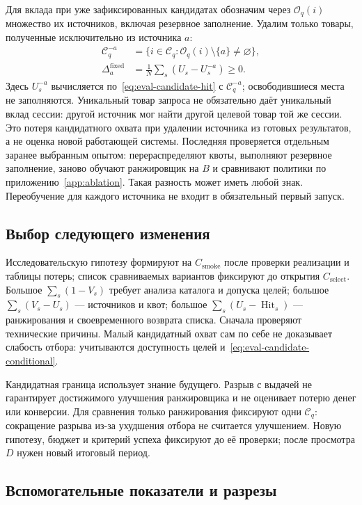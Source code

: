 \documentclass[12pt,a4paper]{article}
\theoremstyle{plainru}
\begin{document}
Для вклада при уже зафиксированных кандидатах обозначим через
$\mathcal O_q(i)$ множество их источников, включая резервное заполнение.
Удалим только товары, полученные исключительно из источника $a$:
\begin{align}\label{eq:eval-source-removal}
\mathcal C_q^{-a}
&=\{i\in\mathcal C_q:\mathcal O_q(i)\setminus\{a\}\ne\varnothing\},\\
\Delta_a^{\mathrm{fixed}}
&=\frac1N\sum_s(U_s-U_s^{-a})\ge0.
\nonumber
\end{align}
Здесь $U_s^{-a}$ вычисляется по~\eqref{eq:eval-candidate-hit}
с $\mathcal C_q^{-a}$; освободившиеся места не заполняются.
Уникальный товар запроса не обязательно даёт уникальный вклад сессии:
другой источник мог найти другой целевой товар той же сессии.
Это потеря кандидатного охвата при удалении источника из готовых
результатов, а не оценка новой работающей системы.
Последняя проверяется отдельным заранее выбранным опытом:
перераспределяют квоты, выполняют резервное заполнение, заново обучают
ранжировщик на $B$ и сравнивают политики по приложению~\ref{app:ablation}.
Такая разность может иметь любой знак. Переобучение для каждого
источника не входит в обязательный первый запуск.

\subsection{Выбор следующего изменения}
\label{sec:eval-next-step}

Исследовательскую гипотезу формируют на $C_{\mathrm{smoke}}$ после
проверки реализации и таблицы потерь; список сравниваемых вариантов
фиксируют до открытия $C_{\mathrm{select}}$.
Большое $\sum_s(1-V_s)$ требует анализа каталога и допуска целей;
большое $\sum_s(V_s-U_s)$ --- источников и квот;
большое $\sum_s(U_s-\operatorname{Hit}_s)$ --- ранжирования
и своевременного возврата списка. Сначала проверяют технические причины.
Малый кандидатный охват сам по себе не доказывает слабость отбора:
учитываются доступность целей и~\eqref{eq:eval-candidate-conditional}.

Кандидатная граница использует знание будущего. Разрыв с выдачей
не гарантирует достижимого улучшения ранжировщика и не оценивает
потерю денег или конверсии. Для сравнения только ранжирования фиксируют
одни $\mathcal C_q$: сокращение разрыва из-за ухудшения отбора
не считается улучшением. Новую гипотезу, бюджет и критерий успеха
фиксируют до её проверки; после просмотра $D$ нужен новый итоговый период.

\subsection{Вспомогательные показатели и разрезы}
\label{sec:eval-diagnostics}
\end{document}
